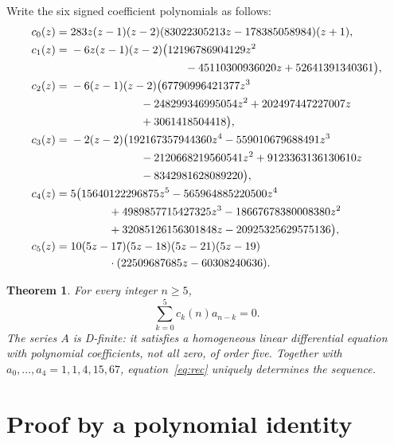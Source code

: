 \documentclass[10pt]{article}
\newtheorem{theorem}{Theorem}
\begin{document}
Write the six signed coefficient polynomials as follows:
\begin{align*}
c_0(z)={}&283z(z-1)(z-2)(83022305213z-178385058984)(z+1),\\
c_1(z)={}&-6z(z-1)(z-2)\bigl(12196786904129z^2\\*
 &\hspace{36mm}-45110300936020z+52641391340361\bigr),\\
c_2(z)={}&-6(z-1)(z-2)\bigl(67790996421377z^3\\*
 &\hspace{22mm}-248299346995054z^2+202497447227007z\\*
 &\hspace{22mm}+3061418504418\bigr),\\
c_3(z)={}&-2(z-2)\bigl(192167357944360z^4-559010679688491z^3\\*
 &\hspace{22mm}-2120668219560541z^2+9123363136130610z\\*
 &\hspace{22mm}-8342981628089220\bigr),\\
c_4(z)={}&5\bigl(15640122296875z^5-565964885220500z^4\\*
 &\hspace{12mm}+4989857715427325z^3-18667678380008380z^2\\*
 &\hspace{12mm}+32085126156301848z-20925325629575136\bigr),\\
c_5(z)={}&10(5z-17)(5z-18)(5z-21)(5z-19)\\*
 &\hspace{12mm}\cdot(22509687685z-60308240636).
\end{align*}

\begin{theorem}\label{thm:main}
For every integer $n\geq5$,
\begin{equation}\label{eq:rec}
 \sum_{k=0}^{5}c_k(n)a_{n-k}=0.
\end{equation}
The series $A$ is D-finite: it satisfies a homogeneous linear differential
equation with polynomial coefficients, not all zero, of order five.
Together with $a_0,\ldots,a_4=1,1,4,15,67$, equation~\eqref{eq:rec}
uniquely determines the sequence.
\end{theorem}

\section{Proof by a polynomial identity}
\end{document}
